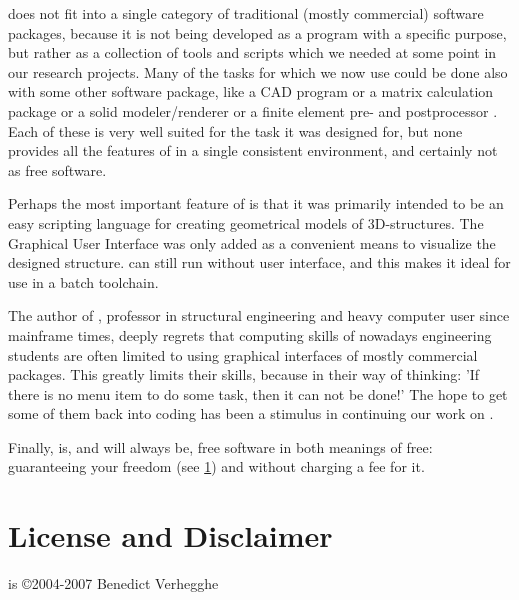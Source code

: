 \pyformex does not fit into a single category of traditional (mostly commercial) software packages, because it is not being developed as a program with a specific purpose, but rather as a collection of tools and scripts which we needed at some point in our research projects. Many of the tasks for which we now use \pyformex could be done also with some other software package, like a CAD program %
or a %
matrix calculation package or a solid modeler/renderer %
or a finite element pre- and postprocessor%
. Each of these is very well suited for the task it was designed for, but none provides all the features of \pyformex in a single consistent environment, and certainly not as free software. 

Perhaps the most important feature of \pyformex is that it was primarily intended to be an easy scripting language for creating geometrical models of 3D-structures. The Graphical User Interface was only added as a convenient means to visualize the designed structure. \pyformex can still run without user interface, and this makes it ideal for use in a batch toolchain.

The author of \pyformex, professor in structural engineering and heavy computer user since mainframe times, deeply regrets that computing skills of nowadays engineering students are often limited to using graphical interfaces of mostly commercial packages. This greatly limits their skills, because in their way of thinking: 'If there is no menu item to do some task, then it can not be done!'
The hope to get some of them back into coding has been a stimulus in continuing our work on \pyformex. 
 
Finally, \pyformex is, and will always be, free software in both meanings of free: guaranteeing your freedom (see \ref{sec:license}) and without charging a fee for it. 



\section{License and Disclaimer}
\label{sec:license}
\pyformex is \copyright 2004-2007 Benedict Verhegghe


